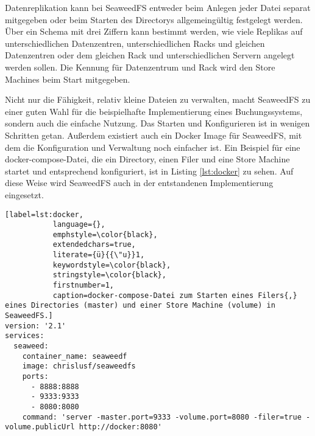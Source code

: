 \documentclass[12pt,oneside,a4paper,parskip]{scrbook}
\begin{document}
Datenreplikation kann bei SeaweedFS entweder beim Anlegen jeder Datei separat mitgegeben oder beim Starten des Directorys allgemeingültig festgelegt werden. Über ein Schema mit drei Ziffern kann bestimmt werden, wie viele Replikas auf unterschiedlichen Datenzentren, unterschiedlichen Racks und gleichen Datenzentren oder dem gleichen Rack und unterschiedlichen Servern angelegt werden sollen. Die Kennung für Datenzentrum und Rack wird den Store Machines beim Start mitgegeben.

Nicht nur die Fähigkeit, relativ kleine Dateien zu verwalten, macht SeaweedFS zu einer guten Wahl für die beispielhafte Implementierung eines Buchungssystems, sondern auch die einfache Nutzung. Das Starten und Konfigurieren ist in wenigen Schritten getan. Außerdem existiert auch ein Docker Image für SeaweedFS, mit dem die Konfiguration und Verwaltung noch einfacher ist. Ein Beispiel für eine docker-compose-Datei, die ein Directory, einen Filer und eine Store Machine startet und entsprechend konfiguriert, ist in Listing \ref{lst:docker} zu sehen. Auf diese Weise wird SeaweedFS auch in der entstandenen Implementierung eingesetzt.

\begin{lstlisting}[label=lst:docker,
           language={},
           emphstyle=\color{black},
           extendedchars=true,
           literate={ü}{{\"u}}1,
           keywordstyle=\color{black},
           stringstyle=\color{black},
           firstnumber=1,
           caption=docker-compose-Datei zum Starten eines Filers{,} eines Directories (master) und einer Store Machine (volume) in SeaweedFS.]          
version: '2.1'
services:
  seaweed:
    container_name: seaweedf
    image: chrislusf/seaweedfs
    ports:
      - 8888:8888
      - 9333:9333
      - 8080:8080
    command: 'server -master.port=9333 -volume.port=8080 -filer=true -volume.publicUrl http://docker:8080'
\end{lstlisting}
\end{document}
